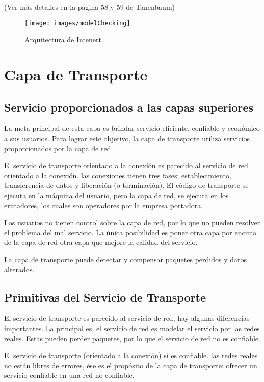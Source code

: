 \documentclass[12pt]{report}
\begin{document}
(Ver  m\'as detalles en la p\'agina 58 y 59 de Tanenbaum)
\begin{figure}[!h]
\texttt{[image: images/modelChecking]}
\caption{Arquitectura de Intenert.}
\label{modelchecking-IO}
\end{figure}


\section*{Capa de Transporte}

\subsection*{Servicio proporcionados a las capas superiores}		

La meta principal de esta capa es brindar servicio eficiente, confiable y econ\'omico a sus usuarios. Para lograr este objetivo, la capa de transporte utiliza servicios proporcionados por la capa de red. 

El servicio de transporte orientado a la conexi\'on es parecido al servicio de red orientado a la conexi\'on. las conexiones tienen tres fases: establecimiento, transferencia de datos y liberaci\'on (o terminaci\'on). El c\'odigo de transporte se ejecuta en la m\'aquina del usuario, pero la capa de red, se ejecuta en los erutadores, los cuales son operadores por la empresa portadora.

Los usuarios no tienen control sobre la capa de red, por lo que no pueden resolver el problema del mal servicio. La \'unica posibilidad es poner otra capa por encima de la capa de red otra capa que mejore la calidad del servicio. 

La capa de transporte puede detectar y compensar paquetes perdidos y datos alterados.

\subsection*{Primitivas del Servicio de Transporte}

El servicio de transporte es parecido al servicio de red, hay algunas diferencias importantes. La principal es, el servicio de red es modelar el servicio por las redes reales. Estas pueden perder paquetes, por lo que el servicio de red no es confiable. 

El servicio de transporte (orientado a la conexi\'on) s\'i es confiable. las redes reales no est\'an libres de errores, \'ese es el prop\'osito de la capa de transporte: ofrecer un servicio confiable en una red no confiable.
\end{document}
